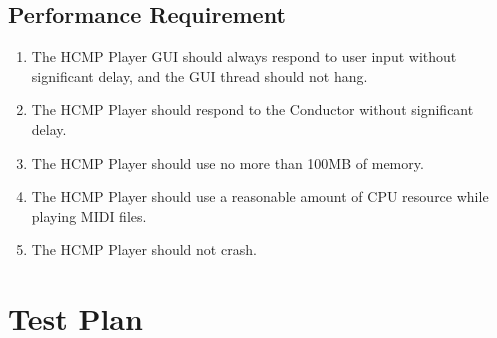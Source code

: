 \subsection{Performance Requirement}
\begin{enumerate}
  \item The HCMP Player GUI should always respond to user input without 
        significant delay, and the GUI thread should not hang.
  \item The HCMP Player should respond to the Conductor without significant delay.
  \item The HCMP Player should use no more than 100MB of memory.
  \item The HCMP Player should use a reasonable amount of CPU resource while playing 
        MIDI files.
  \item The HCMP Player should not crash.
\end{enumerate}

\section{Test Plan}
